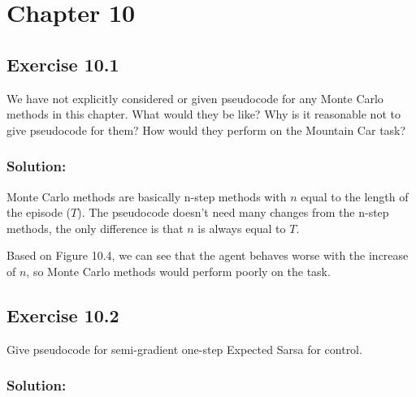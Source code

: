 \section*{Chapter 10}

\subsection*{Exercise 10.1}

We have not explicitly considered or given pseudocode for any Monte Carlo
methods in this chapter. What would they be like? Why is it reasonable not to give
pseudocode for them? How would they perform on the Mountain Car task?
\subsubsection*{Solution:}

Monte Carlo methods are basically n-step methods with $n$ equal to the length of the episode  ($T$).
The pseudocode doesn't need many changes from the n-step methods, the only difference is that $n$ is always equal to $T$.

Based on Figure 10.4, we can see that the agent behaves worse with the increase of $n$, so Monte Carlo methods would perform poorly on the task.

\subsection*{Exercise 10.2}

Give pseudocode for semi-gradient one-step Expected Sarsa for control.

\subsubsection*{Solution:}

